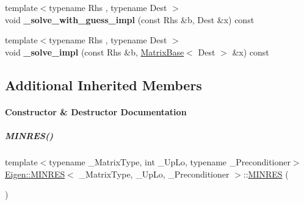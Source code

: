 \begin{DoxyCompactItemize}
\item 
\mbox{\label{group___iterative_linear_solvers___module_a814e31f6e378b394d6627a5b19726f48}} 
{\footnotesize template$<$typename Rhs , typename Dest $>$ }\\void {\bfseries \+\_\+solve\+\_\+with\+\_\+guess\+\_\+impl} (const Rhs \&b, Dest \&x) const
\item 
\mbox{\label{group___iterative_linear_solvers___module_ad67efceb46c9833510956948f6d8980d}} 
{\footnotesize template$<$typename Rhs , typename Dest $>$ }\\void {\bfseries \+\_\+solve\+\_\+impl} (const Rhs \&b, \hyperlink{group___core___module_class_eigen_1_1_matrix_base}{Matrix\+Base}$<$ Dest $>$ \&x) const
\end{DoxyCompactItemize}
\subsection*{Additional Inherited Members}


\paragraph{Constructor \& Destructor Documentation}
\mbox{\label{group___iterative_linear_solvers___module_aa519021be1178a99f5f9ec633de9fc09}} 
\subparagraph{\texorpdfstring{M\+I\+N\+R\+E\+S()}{MINRES()}\hspace{0.1cm}{\footnotesize\ttfamily [1/4]}}
{\footnotesize\ttfamily template$<$typename \+\_\+\+Matrix\+Type, int \+\_\+\+Up\+Lo, typename \+\_\+\+Preconditioner$>$ \\
\hyperlink{group___iterative_linear_solvers___module_class_eigen_1_1_m_i_n_r_e_s}{Eigen\+::\+M\+I\+N\+R\+ES}$<$ \+\_\+\+Matrix\+Type, \+\_\+\+Up\+Lo, \+\_\+\+Preconditioner $>$\+::\hyperlink{group___iterative_linear_solvers___module_class_eigen_1_1_m_i_n_r_e_s}{M\+I\+N\+R\+ES} (\begin{DoxyParamCaption}{ }\end{DoxyParamCaption})\hspace{0.3cm}{\ttfamily [inline]}}

